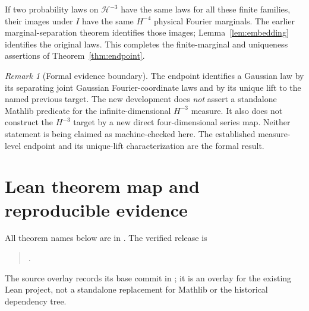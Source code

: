 \documentclass[11pt]{amsart}
\theoremstyle{remark}\newtheorem{remark}[theorem]{Remark}
\newcommand{\HH}[1]{\mathcal H^{-#1}}
\begin{document}
If two probability laws on $\HH{3}$ have the same laws for all these finite families, their images under $I$ have the same $H^{-4}$ physical Fourier marginals. The earlier marginal-separation theorem identifies those images; Lemma~\ref{lem:embedding} identifies the original laws. This completes the finite-marginal and uniqueness assertions of Theorem~\ref{thm:endpoint}.

\begin{remark}[Formal evidence boundary]
The endpoint identifies a Gaussian law by its separating joint Gaussian Fourier-coordinate laws and by its unique lift to the named previous target. The new development does \emph{not} assert a standalone Mathlib  predicate for the infinite-dimensional $H^{-3}$ measure. It also does not construct the $H^{-3}$ target by a new direct four-dimensional series map. Neither statement is being claimed as machine-checked here. The established measure-level endpoint and its unique-lift characterization are the formal result.
\end{remark}

\section{Lean theorem map and reproducible evidence}
All theorem names below are in . The verified release is
\begin{quote}\raggedright
{}.
\end{quote}
The source overlay records its base commit in ; it is an overlay for the existing Lean project, not a standalone replacement for Mathlib or the historical dependency tree.
\end{document}
